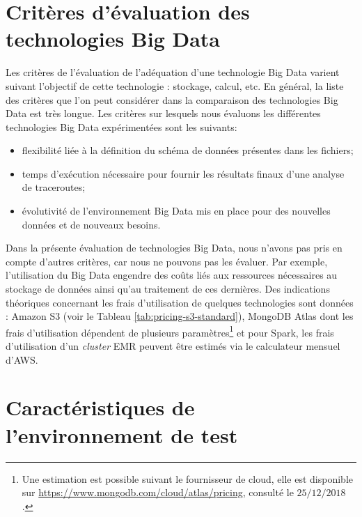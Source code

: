 
\section{Critères d'évaluation des technologies  Big Data}
Les critères de l'évaluation de l'adéquation d'une technologie Big Data  varient  suivant  l'objectif de cette technologie : stockage, calcul, etc.  En général, la liste des critères que l'on peut considérer dans la comparaison des technologies Big Data est très longue.  Les critères sur lesquels nous  évaluons  les différentes technologies  Big Data expérimentées sont les suivants:
\begin{itemize}
	\item flexibilité liée à la définition du  schéma de  données présentes dans les fichiers;
	\item temps d'exécution nécessaire pour fournir les résultats finaux d'une analyse de traceroutes;
	\item évolutivité de l'environnement Big Data mis en place pour des nouvelles données et de nouveaux besoins.
\end{itemize}

Dans la présente évaluation de  technologies Big Data, nous n'avons pas pris en compte d'autres critères, car nous ne pouvons pas les évaluer. Par exemple, l'utilisation du  Big Data engendre des coûts  liés aux ressources nécessaires au stockage de données  ainsi qu'au traitement de ces dernières. Des indications théoriques concernant les frais d'utilisation de quelques technologies sont données
 : Amazon S3 (voir le Tableau \ref{tab:pricing-s3-standard}),  MongoDB Atlas dont les frais d'utilisation  dépendent de plusieurs paramètres\footnote{Une estimation est possible suivant le fournisseur de cloud, elle est disponible  sur \url{https://www.mongodb.com/cloud/atlas/pricing}, consulté le $25/12/2018$.} et pour Spark, les frais d'utilisation d'un \textit{cluster} EMR peuvent être estimés via le  calculateur mensuel d'AWS. 

\section{Caractéristiques de l'environnement de test} \label{machine-openvz-caracteritics}

